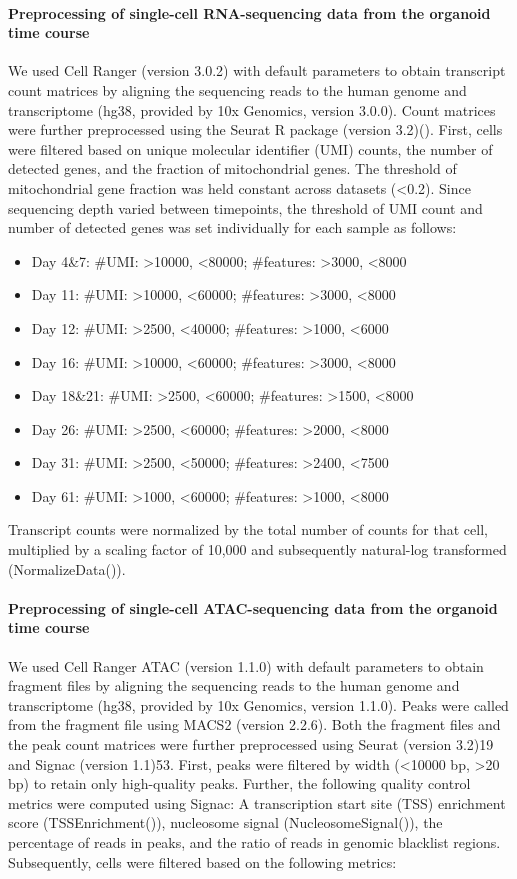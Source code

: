 \paragraph{Preprocessing of single-cell RNA-sequencing data from the organoid time course}
We used Cell Ranger (version 3.0.2) with default parameters to obtain transcript count matrices by aligning the sequencing reads to the human genome and transcriptome (hg38, provided by 10x Genomics, version 3.0.0). Count matrices were further preprocessed using the Seurat R package (version 3.2)(\cite{stuart_comprehensive_2019}). First, cells were filtered based on unique molecular identifier (UMI) counts, the number of detected genes, and the fraction of mitochondrial genes. The threshold of mitochondrial gene fraction was held constant across datasets (<0.2). Since sequencing depth varied between timepoints, the threshold of UMI count and number of detected genes was set individually for each sample as follows:
 
\begin{itemize}
\item Day 4\&7: \#UMI: >10000, <80000;  \#features: >3000, <8000
\item Day 11: \#UMI: >10000, <60000;  \#features: >3000, <8000
\item Day 12: \#UMI: >2500, <40000;  \#features: >1000, <6000
\item Day 16: \#UMI: >10000, <60000;  \#features: >3000, <8000
\item Day 18\&21: \#UMI: >2500, <60000;  \#features: >1500, <8000
\item Day 26: \#UMI: >2500, <60000;  \#features: >2000, <8000
\item Day 31: \#UMI: >2500, <50000;  \#features: >2400, <7500
\item Day 61: \#UMI: >1000, <60000;  \#features: >1000, <8000
\end{itemize}
 
Transcript counts were normalized by the total number of counts for that cell, multiplied by a scaling factor of 10,000 and subsequently natural-log transformed (NormalizeData()).
 
\paragraph{Preprocessing of single-cell ATAC-sequencing data from the organoid time course}
We used Cell Ranger ATAC (version 1.1.0) with default parameters to obtain fragment files by aligning the sequencing reads to the human genome and transcriptome (hg38, provided by 10x Genomics, version 1.1.0). Peaks were called from the fragment file using MACS2 (version 2.2.6). Both the fragment files and the peak count matrices were further preprocessed using Seurat (version 3.2)19 and Signac (version 1.1)53.  First, peaks were filtered by width (<10000 bp, >20 bp) to retain only high-quality peaks. Further, the following quality control metrics were computed using Signac: A transcription start site (TSS) enrichment score (TSSEnrichment()), nucleosome signal (NucleosomeSignal()), the percentage of reads in peaks, and the ratio of reads in genomic blacklist regions. Subsequently, cells were filtered based on the following metrics:

